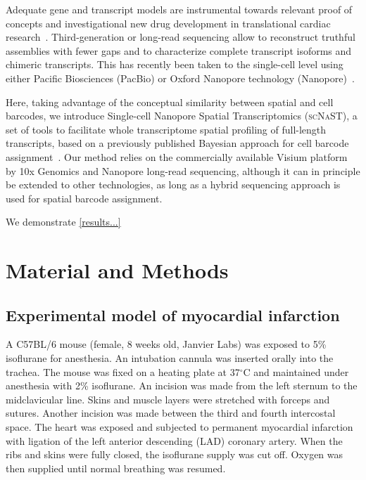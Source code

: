 \documentclass[utf8]{FrontiersinHarvard} %
\newcommand{\scnast}{\textsc{scNaST}\xspace}
\begin{document}
Adequate gene and transcript models are instrumental towards relevant proof of concepts and investigational new drug development in translational cardiac research~\citep{Muller2021:pig_transcriptome}. 
Third-generation or long-read sequencing allow to reconstruct truthful assemblies with fewer gaps and to characterize complete transcript isoforms and chimeric transcripts.
This has recently been taken to the single-cell level using either Pacific Biosciences (PacBio) or Oxford Nanopore technology (Nanopore)~\citep{Gupta2018:ScISOr-Seq,Lebrigand2020:sicelore,Volden2020:R2C2_10x,Wang2021:scnapbar,Joglekar2021:spatial_brain}.

Here, taking advantage of the conceptual similarity between spatial and cell barcodes, we introduce Single-cell Nanopore Spatial Transcriptomics (\scnast), a set of tools to facilitate whole transcriptome spatial profiling of full-length transcripts, based on a previously published Bayesian approach for cell barcode assignment~\citep{Wang2021:scnapbar}. Our method relies on the commercially available Visium platform by 10x Genomics and Nanopore long-read sequencing, although it can in principle be extended to other technologies, as long as a hybrid sequencing approach is used for spatial barcode assignment. 

We demonstrate \ref{results...}


\section*{Material and Methods}

\subsection*{Experimental model of myocardial infarction}
A C57BL/6 mouse (female, 8 weeks old, Janvier Labs) was exposed to 5\% isoflurane for anesthesia. An intubation cannula was inserted orally into the trachea. The mouse was fixed on a heating plate at 37$^\circ$C and maintained under anesthesia with 2\% isoflurane. An incision was made from the left sternum to the midclavicular line. Skins and muscle layers were stretched with forceps and sutures. Another incision was made between the third and fourth intercostal space. The heart was exposed and subjected to permanent myocardial infarction with ligation of the left anterior descending (LAD) coronary artery. When the ribs and skins were fully closed, the isoflurane supply was cut off. Oxygen was then supplied until normal breathing was resumed. 
\end{document}

